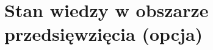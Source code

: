 \documentclass[../main.tex]{subfiles}
\begin{document}
\section{Stan wiedzy w obszarze przedsięwzięcia (opcja)}
\end{document}
